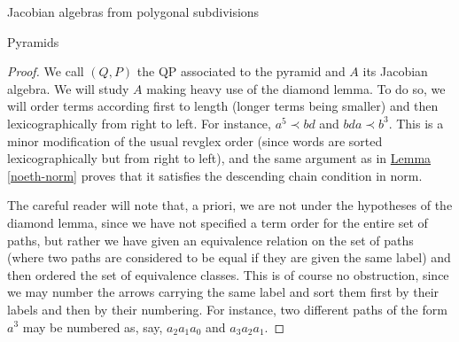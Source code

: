 \begin{chapter}{Jacobian algebras from polygonal subdivisions}
\begin{section}{Pyramids}
\begin{proof}
We call $(Q,P)$ the QP associated to the pyramid and $A$ its Jacobian algebra. We will study $A$ making heavy use of the diamond lemma. To do so, we will order terms according first to length (longer terms being smaller) and then lexicographically from right to left. For instance, $a^5 \prec bd$ and $bda \prec b^3$. This is a minor modification of the usual revglex order (since words are sorted lexicographically but from right to left), and the same argument as in \hyperref[noeth-norm]{Lemma \ref*{noeth-norm}} proves that it satisfies the descending chain condition in norm.

The careful reader will note that, a priori, we are not under the hypotheses of the diamond lemma, since we have not specified a term order for the entire set of paths, but rather we have given an equivalence relation on the set of paths (where two paths are considered to be equal if they are given the same label) and then ordered the set of equivalence classes. This is of course no obstruction, since we may number the arrows carrying the same label and sort them first by their labels and then by their numbering. For instance, two different paths of the form $a^3$ may be numbered as, say, $a_2a_1a_0$ and $a_3a_2a_1$.


\end{proof}
\end{section}
\end{chapter}
